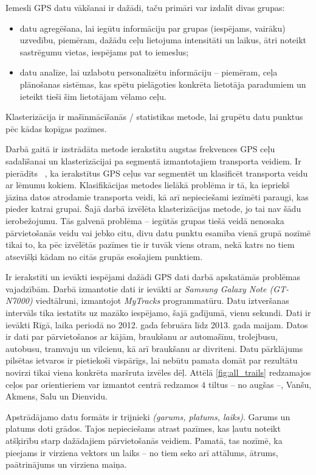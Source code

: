 \documentclass{ludis}
\begin{document}
Iemesli GPS datu vākšanai ir dažādi, taču primāri var izdalīt divas grupas:
\begin{itemize}
\item datu agregēšana, lai iegūtu informāciju par grupas (iespējams, vairāku) uzvedību, piemēram, 
  dažādu ceļu lietojuma intensitāti un laikus, ātri noteikt sastrēgumu vietas, iespējams pat to 
  iemeslus;
\item datu analīze, lai uzlabotu personalizētu informāciju -- piemēram, ceļa plānošanas sistēmas,
  kas spētu pielāgoties konkrēta lietotāja paradumiem un ieteikt tieši šim lietotājam vēlamo ceļu.
\end{itemize}

Klasterizācija ir mašīnmācīšanās / statistikas metode, lai grupētu datu punktus pēc kādas kopīgas
pazīmes.

Darbā gaitā ir izstrādāta metode ierakstītu augstas frekvences GPS ceļu sadalīšanai un 
klasterizācijai pa segmentā izmantotajiem transporta veidiem. Ir pierādīts 
~\cite{zheng_gps_segmentation}, ka ierakstītus GPS ceļus var segmentēt un klasificēt transporta
veidu ar lēmumu kokiem. Klasifikācijas metodes lielākā problēma ir tā, ka iepriekš jāzina 
datos atrodamie transporta veidi, kā arī nepieciešami iezīmēti paraugi, kas pieder katrai grupai.
Šajā darbā izvēlēta klasterizācijas metode, jo tai nav šādu ierobežojumu. Tās galvenā problēma --
iegūtās grupas tiešā veidā nenosaka pārvietošanās veidu vai jebko citu, divu datu punktu esamība
vienā grupā nozīmē tikai to, ka pēc izvēlētās pazīmes tie ir tuvāk viens otram, nekā katrs 
no tiem atsevišķi kādam no citās grupās esošajiem punktiem.

Ir ierakstīti un ievākti iespējami dažādi GPS dati darbā apskatāmās problēmas vajadzībām. 
Darbā izmantotie dati ir ievākti ar \emph{Samsung Galaxy Note (GT-N7000)} viedtālruni, izmantojot
\emph{MyTracks} programmatūru. Datu iztveršanas intervāls tika iestatīts uz mazāko iespējamo,
šajā gadījumā, vienu sekundi. Dati ir ievākti Rīgā, laika periodā no 2012. gada februāra līdz 
2013. gada maijam. Datos ir dati par pārvietošanos ar kājām, braukšanu ar automašīnu, trolejbusu,
autobusu, tramvaju un vilcienu, kā arī braukšanu ar divriteni. Datu pārklājums pilsētas ietvaros 
ir pietiekoši vispārīgs, lai nebūtu pamata domāt par rezultātu novirzi tikai viena konkrēta 
maršruta izvēles dēļ. Attēlā \ref{fig:all_trails} redzamajos ceļos par orientieriem var izmantot
centrā redzamos $4$ tiltus -- no augšas --, Vanšu, Akmens, Salu un Dienvidu.

Apstrādājamo datu formāts ir trijnieki \emph{(garums, platums, laiks)}. Garums un platums doti 
grādos. Tajos nepieciešams atrast pazīmes, kas ļautu noteikt atšķirību starp dažādajiem 
pārvietošanās veidiem. Pamatā, tas nozīmē, ka pieejams ir virziena vektors un laiks -- no tiem
seko arī attālums, ātrums, paātrinājums un virziena maiņa.
\end{document}
